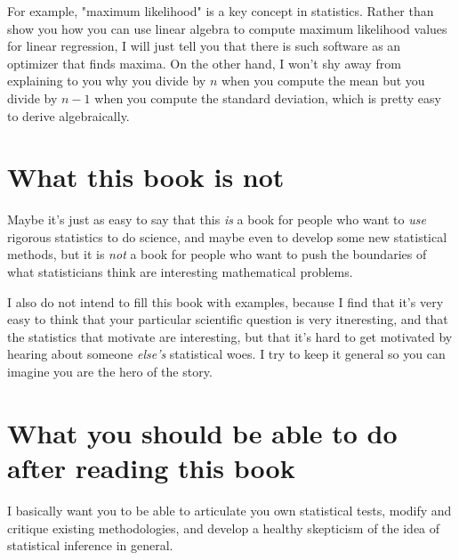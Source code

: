 For example, "maximum likelihood" is a key concept in statistics. Rather than
show you how you can use linear algebra to compute maximum likelihood values
for linear regression, I will just tell you that there is such software as an
optimizer that finds maxima. On the other hand, I won't shy away from
explaining to you why you divide by $n$ when you compute the mean but you
divide by $n-1$ when you compute the standard deviation, which is pretty easy
to derive algebraically.

\section*{What this book is not}

Maybe it's just as easy to say that this \emph{is} a book for people who want
to \emph{use} rigorous statistics to do science, and maybe even to develop some
new statistical methods, but it is \emph{not} a book for people who want to
push the boundaries of what statisticians think are interesting mathematical
problems.

I also do not intend to fill this book with examples, because I find that it's
very easy to think that your particular scientific question is very
itneresting, and that the statistics that motivate are interesting, but that
it's hard to get motivated by hearing about someone \emph{else's} statistical
woes. I try to keep it general so you can imagine you are the hero of the story.

\section*{What you should be able to do after reading this book}

I basically want you to be able to articulate you own statistical tests, modify
and critique existing methodologies, and develop a healthy skepticism of the
idea of statistical inference in general.
